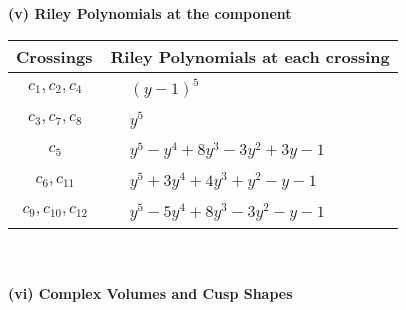 \documentclass[1p]{elsarticle_modified}
\theoremstyle{definition}
\begin{document}
\newpage\renewcommand{\arraystretch}{1}
\flushleft \textbf{(v) Riley Polynomials at the component}\newline \\
\begin{tabular}{m{50pt}|m{274pt}}
Crossings & \hspace{64pt}Riley Polynomials at each crossing \\
\hline $$\begin{aligned}c_{1},c_{2},c_{4}\end{aligned}$$&$\begin{aligned}
&(y-1)^5
\end{aligned}$\\
\hline $$\begin{aligned}c_{3},c_{7},c_{8}\end{aligned}$$&$\begin{aligned}
&y^5
\end{aligned}$\\
\hline $$\begin{aligned}c_{5}\end{aligned}$$&$\begin{aligned}
&y^5- y^4+8 y^3-3 y^2+3 y-1
\end{aligned}$\\
\hline $$\begin{aligned}c_{6},c_{11}\end{aligned}$$&$\begin{aligned}
&y^5+3 y^4+4 y^3+y^2- y-1
\end{aligned}$\\
\hline $$\begin{aligned}c_{9},c_{10},c_{12}\end{aligned}$$&$\begin{aligned}
&y^5-5 y^4+8 y^3-3 y^2- y-1
\end{aligned}$\\
\hline
\end{tabular}\\~\\
\newpage\flushleft \textbf{(vi) Complex Volumes and Cusp Shapes}
\end{document}
